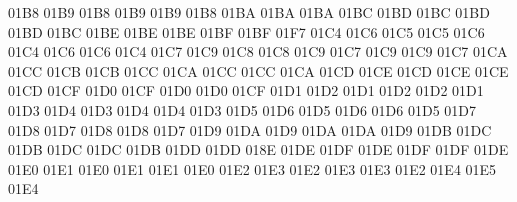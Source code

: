 \setcclcuc 01B8 01B9 01B8 %
\setcclcuc 01B9 01B9 01B8 %
\setcclcuc 01BA 01BA 01BA %
\setcclcuc 01BC 01BD 01BC %
\setcclcuc 01BD 01BD 01BC %
\setcclcuc 01BE 01BE 01BE %
\setcclcuc 01BF 01BF 01F7 %
\setcclcuc 01C4 01C6 01C5 %
\setcclcuc 01C5 01C6 01C4 %
\setcclcuc 01C6 01C6 01C4 %
\setcclcuc 01C7 01C9 01C8 %
\setcclcuc 01C8 01C9 01C7 %
\setcclcuc 01C9 01C9 01C7 %
\setcclcuc 01CA 01CC 01CB %
\setcclcuc 01CB 01CC 01CA %
\setcclcuc 01CC 01CC 01CA %
\setcclcuc 01CD 01CE 01CD %
\setcclcuc 01CE 01CE 01CD %
\setcclcuc 01CF 01D0 01CF %
\setcclcuc 01D0 01D0 01CF %
\setcclcuc 01D1 01D2 01D1 %
\setcclcuc 01D2 01D2 01D1 %
\setcclcuc 01D3 01D4 01D3 %
\setcclcuc 01D4 01D4 01D3 %
\setcclcuc 01D5 01D6 01D5 %
\setcclcuc 01D6 01D6 01D5 %
\setcclcuc 01D7 01D8 01D7 %
\setcclcuc 01D8 01D8 01D7 %
\setcclcuc 01D9 01DA 01D9 %
\setcclcuc 01DA 01DA 01D9 %
\setcclcuc 01DB 01DC 01DB %
\setcclcuc 01DC 01DC 01DB %
\setcclcuc 01DD 01DD 018E %
\setcclcuc 01DE 01DF 01DE %
\setcclcuc 01DF 01DF 01DE %
\setcclcuc 01E0 01E1 01E0 %
\setcclcuc 01E1 01E1 01E0 %
\setcclcuc 01E2 01E3 01E2 %
\setcclcuc 01E3 01E3 01E2 %
\setcclcuc 01E4 01E5 01E4 %
